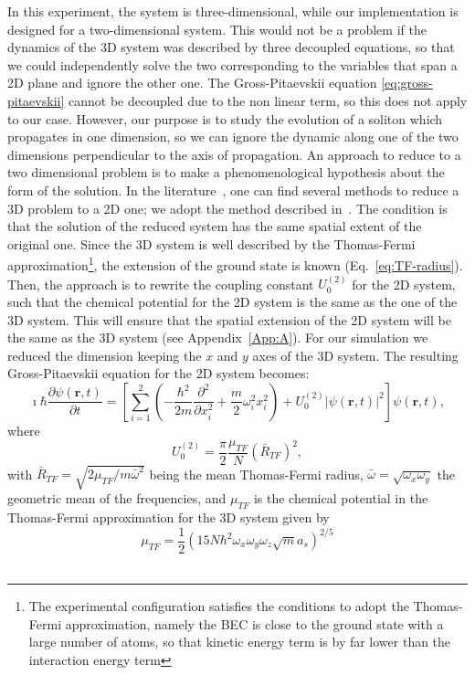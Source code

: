 In this experiment, the system is three-dimensional, while our implementation is designed for a two-dimensional system. This would not be a problem if the dynamics of the 3D system was described by three decoupled equations, so that we could independently solve the two corresponding to the variables that span a 2D plane and ignore the other one. The Gross-Pitaevskii equation \eqref{eq:gross-pitaevskii} cannot be decoupled due to the non linear term, so this does not apply to our case. However, our purpose is to study the evolution of a soliton which propagates in one dimension, so we can ignore the dynamic along one of the two dimensions perpendicular to the axis of propagation. An approach to reduce to a two dimensional problem is to make a phenomenological hypothesis about the form of the solution. In the literature~\citep{JKP98,SZ98,Sal01,SPR02,MM03}, one can find several methods to reduce a 3D problem to a 2D one; we adopt the method described in~\citep{PietroMassignan}. The condition is that the solution of the reduced system has the same spatial extent of the original one. Since the 3D system is well described by the Thomas-Fermi approximation\footnote{The experimental configuration satisfies the conditions to adopt the Thomas-Fermi approximation, namely the BEC is close to the ground state with a large number of atoms, so that kinetic energy term is by far lower than the interaction energy term}, the extension of the ground state is known (Eq.~\eqref{eq:TF-radius}). Then, the approach is to rewrite the coupling constant $U_0^{(2)}$ for the 2D system, such that the chemical potential for the 2D system is the same as the one of the 3D system. This will ensure that the spatial extension of the 2D system will be the same as the 3D system (see Appendix~\ref{App:A}). For our simulation we reduced the dimension keeping the $x$ and $y$ axes of the 3D system. The resulting Gross-Pitaevskii equation for the 2D system becomes:
\begin{equation} \label{eq:gross-pitaevskii-simulation}
\imath \hbar \frac{\partial \psi(\textbf{r}, t)}{\partial t} = \left[ \sum_{i=1}^2 \left( -\frac{\hbar^2}{2m} \frac{\partial^2}{\partial x_i^2} + \frac{m}{2} \omega_i^2 x_i^2 \right) + U_0^{(2)} |\psi(\textbf{r}, t)|^2 \right] \psi(\textbf{r}, t),
\end{equation}
where
\begin{equation}
U_0^{(2)} = \frac{\pi}{2} \frac{\mu_{TF}}{N} \left( \bar{R}_{TF} \right)^2 ,
\end{equation}
with $\bar{R}_{TF} = \sqrt{2\mu_{TF} / m \bar{\omega}^2}$ being the mean Thomas-Fermi radius, $\bar{\omega} = \sqrt{ \omega_x \omega_y}$ the geometric mean of the frequencies,
and $\mu_{TF}$ is the chemical potential in the Thomas-Fermi approximation for the 3D system given by
\begin{equation}
\mu_{TF} = \frac{1}{2} \left( 15 N \hbar^2 \omega_x \omega_y \omega_z \sqrt{m} a_s \right)^{2/5}
\end{equation}
\\

